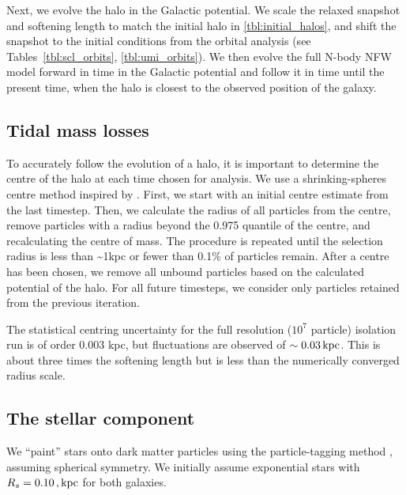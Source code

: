 Next, we evolve the halo in the Galactic potential. We scale the relaxed
snapshot and softening length to match the initial halo in
\ref{tbl:initial_halos}, and shift the snapshot to the initial
conditions from the orbital analysis (see
Tables~\ref{tbl:scl_orbits}, \ref{tbl:umi_orbits}). We then evolve the
full N-body NFW model forward in time in the Galactic potential and
follow it in time until the present time, when the halo is closest to
the observed position of the galaxy.

\subsection{Tidal mass losses}\label{sec:shrinking_spheres}

To accurately follow the evolution of a halo, it is important to
determine the centre of the halo at each time chosen for analysis. We
use a shrinking-spheres centre method inspired by \citet{power+2003}.
First, we start with an initial centre estimate from the last timestep.
Then, we calculate the radius of all particles from the centre, remove
particles with a radius beyond the 0.975 quantile of the centre, and
recalculating the centre of mass. The procedure is repeated until the
selection radius is less than \textasciitilde1kpc or fewer than 0.1\% of
particles remain. After a centre has been chosen, we remove all unbound
particles based on the \gadget{} calculated potential of the halo. For
all future timesteps, we consider only particles retained from the
previous iteration.

The statistical centring uncertainty for the full resolution (\(10^7\)
particle) isolation run is of order 0.003 kpc, but fluctuations are
observed of \(\sim 0.03\,{\rm kpc}\). This is about three times the softening
length but is less than the numerically converged radius scale.

\subsection{The stellar component}\label{sec:painting_stars}

We ``paint'' stars onto dark matter particles using the particle-tagging
method \citep[e.g.,][]{bullock+johnston2005}, assuming spherical
symmetry. We initially assume exponential stars with
\(R_s = 0.10\,,{\rm kpc}\) for both galaxies.

